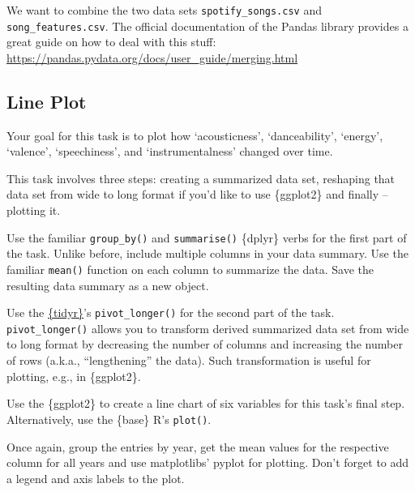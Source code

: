 \documentclass[
  11pt,
]{book}
\newenvironment{tips}[1]
  {
  \begin{itemize}
  \footnotesize
  \renewcommand{\labelitemi}{
    \raisebox{-.7\height}[0pt][0pt]{
      {\setkeys{Gin}{width=3em,keepaspectratio}
        \texttt{[image: images/\#1.png]}}
    }
  }
  \setlength{\fboxsep}{1em}
  \begin{rbox}
  \item
  }
  {
  \end{rbox}
  \end{itemize}
  }
\newenvironment{tipsp}[1]
  {
  \begin{itemize}
  \footnotesize
  \renewcommand{\labelitemi}{
    \raisebox{-.7\height}[0pt][0pt]{
      {\setkeys{Gin}{width=3em,keepaspectratio}
        \texttt{[image: images/\#1.png]}}
    }
  }
  \setlength{\fboxsep}{1em}
  \begin{pbox}
  \item
  }
  {
  \end{pbox}
  \end{itemize}
  }
\begin{document}
\begin{tipsp}p

We want to combine the two data sets \texttt{spotify\_songs.csv} and \texttt{song\_features.csv}.
The official documentation of the Pandas library provides a great guide on how to deal with this stuff:
\url{https://pandas.pydata.org/docs/user_guide/merging.html}

\end{tipsp}

\hypertarget{line-plot}{%
\subsection{Line Plot}\label{line-plot}}

Your goal for this task is to plot how `acousticness', `danceability', `energy', `valence', `speechiness', and `instrumentalness' changed over time.

\begin{tips}r

This task involves three steps: creating a summarized data set, reshaping that data set from wide to long format if you'd like to use \{ggplot2\} and finally -- plotting it.

Use the familiar \texttt{group\_by()} and \texttt{summarise()} \{dplyr\} verbs for the first part of the task. Unlike before, include multiple columns in your data summary. Use the familiar \texttt{mean()} function on each column to summarize the data. Save the resulting data summary as a new object.

Use the \href{https://tidyr.tidyverse.org}{\{tidyr\}}'s \texttt{pivot\_longer()} for the second part of the task. \texttt{pivot\_longer()} allows you to transform derived summarized data set from wide to long format by decreasing the number of columns and increasing the number of rows (a.k.a., ``lengthening'' the data). Such transformation is useful for plotting, e.g., in \{ggplot2\}.

Use the \{ggplot2\} to create a line chart of six variables for this task's final step. Alternatively, use the \{base\} R's \texttt{plot()}.

\end{tips}

\begin{tipsp}p

Once again, group the entries by year, get the mean values for the respective column for all years and use matplotlibs' pyplot for plotting.
Don't forget to add a legend and axis labels to the plot.

\end{tipsp}
\end{document}

